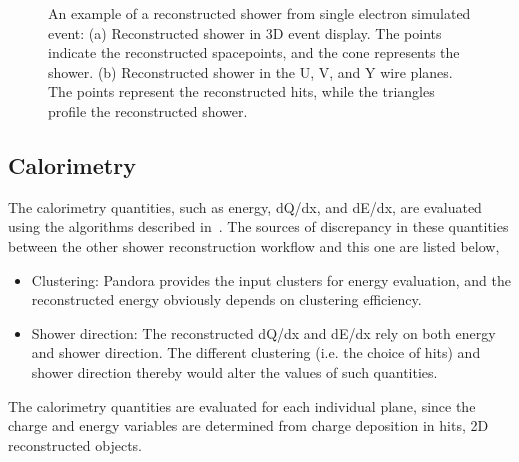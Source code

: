 \begin{figure}[htbp]
\begin{center}
\begin{subfigure}{0.4\textwidth}
\caption{}
\label{fig:shr_reco_example_2d}
\end{subfigure}
\caption{An example of a reconstructed shower from single electron
simulated event: (a) Reconstructed shower in 3D event display.
The points indicate the reconstructed spacepoints, and the cone
represents the shower.
(b) Reconstructed shower in the U, V, and Y wire planes.
The points represent the reconstructed hits, while the triangles
profile the reconstructed shower.}
\label{fig:shr_reco_example}
\end{center}
\end{figure}

\subsection{Calorimetry}
\label{sec:shr_calorimetry}

The calorimetry quantities, such as energy, dQ/dx, and dE/dx, are
evaluated using the algorithms described in~\cite{DocDB5857}.
The sources of discrepancy in these quantities between the other
shower reconstruction workflow and this one are listed below,
\begin{itemize}
\item Clustering: Pandora provides the input clusters for energy
      evaluation, and the reconstructed energy obviously depends
      on clustering efficiency.
\item Shower direction: The reconstructed dQ/dx and dE/dx rely on
      both energy and shower direction.  
      The different clustering (i.e. the  choice of hits) and 
      shower direction thereby would alter the values of such
      quantities.
\end{itemize}

The calorimetry quantities are evaluated for each individual plane,
since the charge and energy variables are determined from charge
deposition in hits, 2D reconstructed objects.\\

